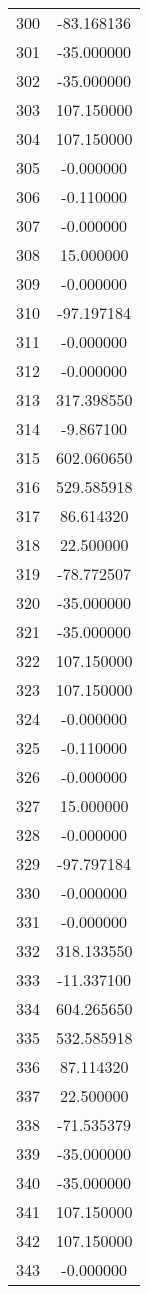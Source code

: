 \documentclass[12pt]{article}
\begin{document}
\begin{longtable}{@{}cc@{}}
300 & -83.168136 \\
301 & -35.000000 \\
302 & -35.000000 \\
303 & 107.150000 \\
304 & 107.150000 \\
305 & -0.000000 \\
306 & -0.110000 \\
307 & -0.000000 \\
308 & 15.000000 \\
309 & -0.000000 \\
310 & -97.197184 \\
311 & -0.000000 \\
312 & -0.000000 \\
313 & 317.398550 \\
314 & -9.867100 \\
315 & 602.060650 \\
316 & 529.585918 \\
317 & 86.614320 \\
318 & 22.500000 \\
319 & -78.772507 \\
320 & -35.000000 \\
321 & -35.000000 \\
322 & 107.150000 \\
323 & 107.150000 \\
324 & -0.000000 \\
325 & -0.110000 \\
326 & -0.000000 \\
327 & 15.000000 \\
328 & -0.000000 \\
329 & -97.797184 \\
330 & -0.000000 \\
331 & -0.000000 \\
332 & 318.133550 \\
333 & -11.337100 \\
334 & 604.265650 \\
335 & 532.585918 \\
336 & 87.114320 \\
337 & 22.500000 \\
338 & -71.535379 \\
339 & -35.000000 \\
340 & -35.000000 \\
341 & 107.150000 \\
342 & 107.150000 \\
343 & -0.000000 \\

\end{longtable}
\end{document}
